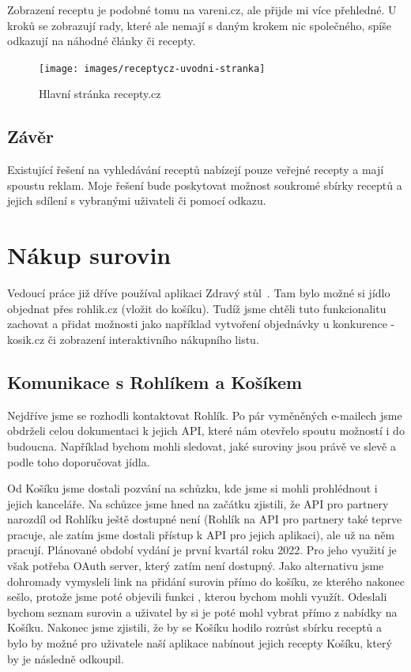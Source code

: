 Zobrazení receptu je podobné tomu na vareni.cz, ale přijde mi více přehledné. U kroků se zobrazují rady, které ale
nemají s daným krokem nic společného, spíše odkazují na náhodné články či recepty.

\begin{figure}[h]
    \texttt{[image: images/receptycz-uvodni-stranka]}
    \caption{Hlavní stránka recepty.cz} \label{picture:receptycz:uvodni-stranka}
\end{figure}

\subsection{Závěr}

Existující řešení na vyhledávání receptů nabízejí pouze veřejné recepty a mají spoustu reklam. Moje řešení bude poskytovat
možnost soukromé sbírky receptů a jejich sdílení s vybranými uživateli či pomocí odkazu.

\section{Nákup surovin}

Vedoucí práce již dříve používal aplikaci Zdravý stůl~\cite{ZdravyStul}. Tam bylo možné si jídlo objednat přes rohlik.cz (vložit do košíku).
Tudíž jsme chtěli tuto funkcionalitu zachovat a přidat možnosti jako například vytvoření objednávky u konkurence - kosik.cz
či zobrazení interaktivního nákupního listu.

\subsection{Komunikace s Rohlíkem a Košíkem}
Nejdříve jsme se rozhodli kontaktovat Rohlík. Po pár vyměněných e-mailech jsme obdrželi celou dokumentaci k jejich API,
které nám otevřelo spoutu možností i do budoucna. Například bychom mohli sledovat, jaké suroviny jsou právě ve slevě a
podle toho doporučovat jídla.

Od Košíku jsme dostali pozvání na schůzku, kde jsme si mohli prohlédnout i jejich kanceláře. Na schůzce jsme hned na začátku
zjistili, že API pro partnery narozdíl od Rohlíku ještě dostupné není (Rohlík na API pro partnery také teprve pracuje,
ale zatím jsme dostali přístup k API pro jejich aplikaci), ale už na něm pracují. Plánované období vydání je
první kvartál roku 2022. Pro jeho využití je však potřeba OAuth server, který zatím není dostupný. %
Jako alternativu jsme dohromady vymysleli link na přidání surovin přímo do košíku, ze kterého nakonec sešlo, protože jsme
poté objevili funkci , kterou bychom mohli využít. Odeslali bychom seznam surovin a uživatel by si je poté
mohl vybrat přímo z nabídky na Košíku. Nakonec jsme zjistili, že by se Košíku hodilo rozrůst sbírku receptů a bylo by možné
pro uživatele naší aplikace nabínout jejich recepty Košíku, který by je následně odkoupil.
